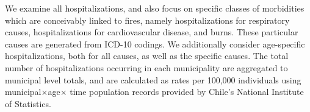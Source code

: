 \documentclass[11pt]{article}
\begin{document}
\begin{spacing}{1.5}
We examine all hospitalizations, and also focus on specific classes of morbidities which are conceivably linked to fires, namely hospitalizations for respiratory causes, hospitalizations for cardiovascular disease, and burns.  These particular causes are generated from ICD-10 codings. We additionally consider age-specific hospitalizations, both for all causes, as well as the specific causes.  The total number of hospitalizations occurring in each municipality are aggregated to municipal level totals, and are calculated as rates per 100,000 individuals using municipal$\times$age$\times$ time population records provided by Chile's National Institute of Statistics. 




\end{spacing}
\end{document}
